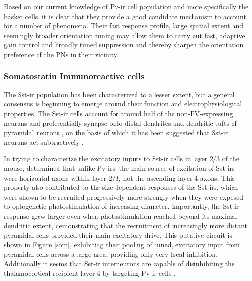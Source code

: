 Based on our current knowledge of Pv-ir cell population and more
specifically the basket cells, it is clear that they provide a good
candidate mechanism to account for a number of phenomena. Their fast
response profile, large spatial extent and seemingly broader
orientation tuning may allow them to carry out fast, adaptive gain
control and broadly tuned suppression and thereby sharpen the
orientation preference of the PNs in their vicinity.

\subsubsection{Somatostatin Immunoreactive cells}

The Sst-ir population has been characterized to a lesser extent, but a
general consensus is beginning to emerge around their function and
electrophysiological properties. The Sst-ir cells account for around
half of the non-PV-expressing neurons \citep{Gonchar2007,Xu2010} and
preferentially synapse onto distal dendrites and dendritic tufts of
pyramidal neurons \citep{DiCristo2004,Silberberg2007}, on the basis of
which it has been suggested that Sst-ir neurons act subtractively
\citep{Wilson2012}.

In trying to characterize the excitatory inputs to Sst-ir cells in
layer 2/3 of the mouse, \cite{Xu2009} determined that unlike Pv-irs,
the main source of excitation of Sst-irs were horizontal axons within
layer 2/3, not the ascending layer 4 axons. This property also
contributed to the size-dependent responses of the Sst-irs, which were
shown to be recruited progressively more strongly when they were
exposed to optogenetic photostimulation of increasing
diameter. Importantly, the Sst-ir response grew larger even when
photostimulation reached beyond its maximal dendritic extent,
demonstrating that the recruitment of increasingly more distant
pyramidal cells provided their main excitatory drive. This putative
circuit is shown in Figure \ref{som}, exhibiting their pooling of
tuned, excitatory input from pyramidal cells across a large area,
providing only very local inhibition. Additionally it seems that
Sst-ir interneurons are capable of disinhibiting the thalamocortical
recipient layer 4 by targeting Pv-ir cells \citep{Xu2013}.

